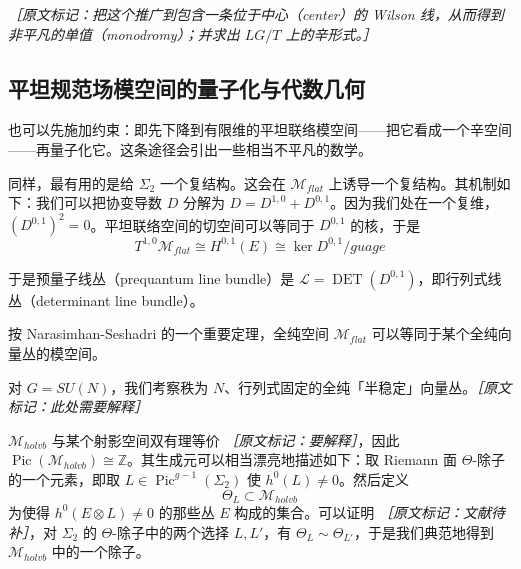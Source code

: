 {\small\itshape ［原文标记：把这个推广到包含一条位于中心（center）的 Wilson 线，从而得到非平凡的单值（monodromy）；并求出 $LG/T$ 上的辛形式。］}

\subsection{平坦规范场模空间的量子化与代数几何} %

也可以先施加约束：即先下降到有限维的平坦联络模空间——把它看成一个辛空间——再量子化它。这条途径会引出一些相当不平凡的数学。

同样，最有用的是给 $\Sigma_2$ 一个复结构。这会在 $\mathcal{M}_{flat}$ 上诱导一个复结构。其机制如下：我们可以把协变导数 $D$ 分解为 $D=D^{1,0}+D^{0,1}$。因为我们处在一个复维，$(D^{0,1})^2=0$。平坦联络空间的切空间可以等同于 $D^{0,1}$ 的核，于是
\begin{equation}
  T^{1,0}\mathcal{M}_{flat}\cong H^{0,1}(E)\cong\ker D^{0,1}/\mathit{guage}
  \tag{3.87}
  \label{eq:3.87}
\end{equation}

于是预量子线丛（prequantum line bundle）是 $\mathcal{L}=\operatorname{DET}(D^{0,1})$，即行列式线丛（determinant line bundle）。

按 Narasimhan-Seshadri 的一个重要定理，全纯空间 $\mathcal{M}_{flat}$ 可以等同于某个全纯向量丛的模空间。


对 $G=SU(N)$，我们考察秩为 $N$、行列式固定的全纯「半稳定」向量丛。{\small\itshape ［原文标记：此处需要解释］}

$\mathcal{M}_{holvb}$ 与某个射影空间双有理等价 {\small\itshape ［原文标记：要解释］}，因此 $\operatorname{Pic}(\mathcal{M}_{holvb})\cong\mathbb{Z}$。其生成元可以相当漂亮地描述如下：取 Riemann 面 $\Theta$-除子的一个元素，即取 $L\in\operatorname{Pic}^{g-1}(\Sigma_2)$ 使 $h^0(L)\neq0$。然后定义
\begin{equation}
  \Theta_L\subset\mathcal{M}_{holvb}
  \tag{3.88}
  \label{eq:3.88}
\end{equation}
为使得 $h^0(E\otimes L)\neq0$ 的那些丛 $E$ 构成的集合。可以证明 {\small\itshape ［原文标记：文献待补］}，对 $\Sigma_2$ 的 $\Theta$-除子中的两个选择 $L,L'$，有 $\Theta_L\sim\Theta_{L'}$，于是我们典范地得到 $\mathcal{M}_{holvb}$ 中的一个除子。

